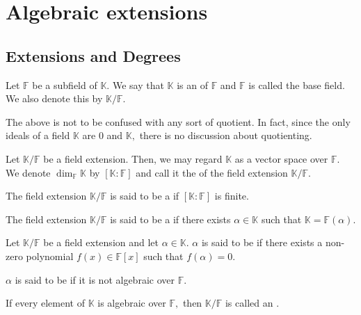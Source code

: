 \chapter{Algebraic extensions}
\section{Extensions and Degrees}

\begin{defn}%
    Let $\mathbb{F}$ be a subfield of $\mathbb{K}.$ We say that $\mathbb{K}$ is an  of $\mathbb{F}$ and $\mathbb{F}$ is called the base field. We also denote this by $\mathbb{K}/\mathbb{F}.$
\end{defn}

\begin{rem}
    The above is not to be confused with any sort of quotient. In fact, since the only ideals of a field $\mathbb{K}$ are $0$ and $\mathbb{K},$ there is no discussion about quotienting.
\end{rem}

\begin{defn}%
    Let $\mathbb{K}/\mathbb{F}$ be a field extension. Then, we may regard $\mathbb{K}$ as a vector space over $\mathbb{F}.$ We denote $\dim_{\mathbb{F}}\mathbb{K}$ by $[\mathbb{K} : \mathbb{F}]$ and call it the  of the field extension $\mathbb{K}/\mathbb{F}.$
\end{defn}

\begin{defn}%
    The field extension $\mathbb{K}/\mathbb{F}$ is said to be a  if $[\mathbb{K} : \mathbb{F}]$ is finite. 
\end{defn}

\begin{defn}%
    The field extension $\mathbb{K}/\mathbb{F}$ is said to be a  if there exists $\alpha \in \mathbb{K}$ such that $\mathbb{K} = \mathbb{F}(\alpha).$
\end{defn}

\begin{defn}
    Let $\mathbb{K}/\mathbb{F}$ be a field extension and let $\alpha \in \mathbb{K}.$ $\alpha$ is said to be  if there exists a non-zero polynomial $f(x) \in \mathbb{F}[x]$ such that $f(\alpha) = 0.$

    $\alpha$ is said to be  if it is not algebraic over $\mathbb{F}.$

    If every element of $\mathbb{K}$ is algebraic over $\mathbb{F},$ then $\mathbb{K}/\mathbb{F}$ is called an .
\end{defn}

